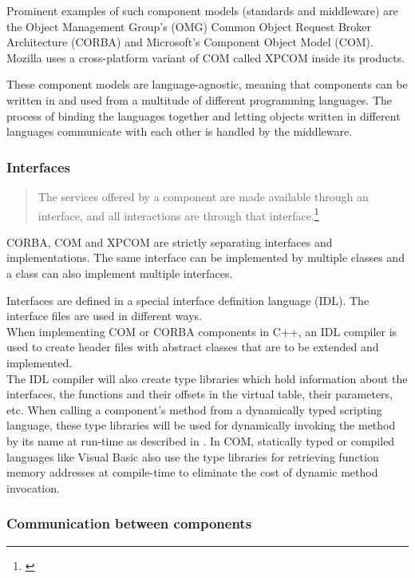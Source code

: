 Prominent examples of such component models (standards and middleware) are the Object Management Group's (OMG) Common Object Request Broker Architecture (CORBA) and Microsoft's Component Object Model (COM). Mozilla uses a cross-platform variant of COM called XPCOM inside its products.

These component models are language-agnostic, meaning that components can be written in and used from a multitude of different programming languages. The process of binding the languages together and letting objects written in different languages communicate with each other is handled by the middleware.

\subsubsection{Interfaces}

\begin{quotation}
The services offered by a component are made available through an interface, and all interactions are through that interface.\footnote{\citep[444]{Sommerville}}
\end{quotation}

CORBA, COM and XPCOM are strictly separating interfaces and implementations. The same interface can be implemented by multiple classes and a class can also implement multiple interfaces.

Interfaces are defined in a special interface definition language (IDL). The interface files are used in different ways.\\
When implementing COM or CORBA components in C++, an IDL compiler is used to create header files with abstract classes that are to be extended and implemented.\\
The IDL compiler will also create type libraries which hold information about the interfaces, the functions and their offsets in the virtual table, their parameters, etc. When calling a component's method from a dynamically typed scripting language, these type libraries will be used for dynamically invoking the method by its name at run-time as described in . In COM, statically typed or compiled languages like Visual Basic also use the type libraries for retrieving function memory addresses at compile-time to eliminate the cost of dynamic method invocation.  

\subsubsection{Communication between components}

